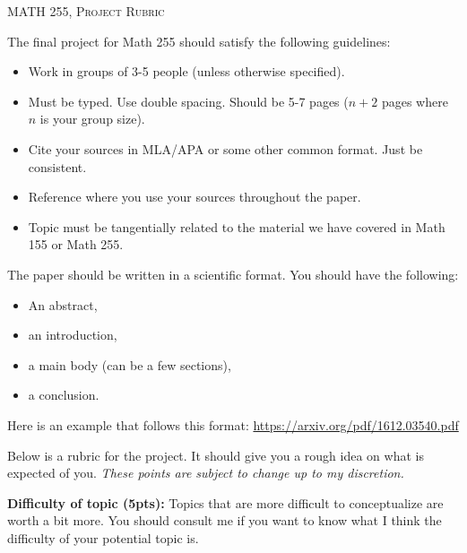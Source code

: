 \documentclass[12pt]{amsbook}
\begin{document}

\SetWatermarkText{
\begin{minipage}[c][8cm]{8cm}
\begin{center}
 
\end{center}
\end{minipage}
}



\begin{center}
   \textsc{\large MATH 255, Project Rubric}
\end{center}
\vspace{.5cm}

The final project for Math 255 should satisfy the following guidelines:
\begin{itemize}
    \item Work in groups of 3-5 people (unless otherwise specified).
    \item Must be typed.  Use double spacing.  Should be 5-7 pages ($n+2$ pages where $n$ is your group size).
    \item Cite your sources in MLA/APA or some other common format.  Just be consistent.
    \item Reference where you use your sources throughout the paper.
    \item Topic must be tangentially related to the material we have covered in Math 155 or Math 255.
\end{itemize}

The paper should be written in a scientific format.  You should have the following:
\begin{itemize}
    \item An abstract,
    \item an introduction,
    \item a main body (can be a few sections),
    \item a conclusion.
\end{itemize}

Here is an example that follows this format: \url{https://arxiv.org/pdf/1612.03540.pdf}
\hspace*{1cm}

Below is a rubric for the project. It should give you a rough idea on what is expected of you. \emph{These points are subject to change up to my discretion.}

\textbf{Difficulty of topic (5pts):} Topics that are more difficult to conceptualize are worth a bit more.  You should consult me if you want to know what I think the difficulty of your potential topic is.
\end{document}
